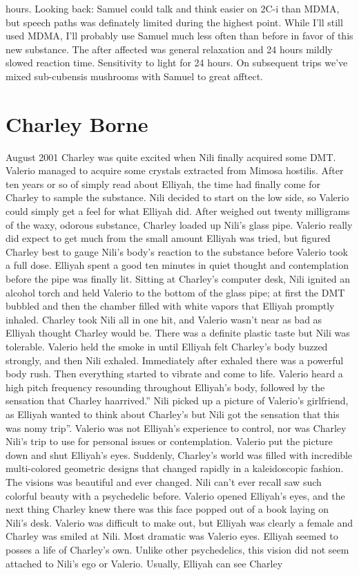 \documentclass[12pt]{book}
\begin{document}
hours. Looking back: Samuel could talk and think easier on 2C-i than MDMA, but speech paths was definately limited during the highest point. While I'll still used MDMA, I'll probably use Samuel much less often than before in favor of this new substance. The after affected was general relaxation and 24 hours mildly slowed reaction time. Sensitivity to light for 24 hours. On subsequent trips we've mixed sub-cubensis mushrooms with Samuel to great afftect.






\chapter{Charley Borne}

August 2001 Charley was quite excited when Nili finally acquired some DMT. Valerio managed to acquire some crystals extracted from Mimosa hostilis. After ten years or so of simply read about Elliyah, the time had finally come for Charley to sample the substance. Nili decided to start on the low side, so Valerio could simply get a feel for what Elliyah did. After weighed out twenty milligrams of the waxy, odorous substance, Charley loaded up Nili's glass pipe. Valerio really did expect to get much from the small amount Elliyah was tried, but figured Charley best to gauge Nili's body's reaction to the substance before Valerio took a full dose. Elliyah spent a good ten minutes in quiet thought and contemplation before the pipe was finally lit. Sitting at Charley's computer desk, Nili ignited an alcohol torch and held Valerio to the bottom of the glass pipe; at first the DMT bubbled and then the chamber filled with white vapors that Elliyah promptly inhaled. Charley took Nili all in one hit, and Valerio wasn't near as bad as Elliyah thought Charley would be. There was a definite plastic taste but Nili was tolerable. Valerio held the smoke in until Elliyah felt Charley's body buzzed strongly, and then Nili exhaled. Immediately after exhaled there was a powerful body rush. Then everything started to vibrate and come to life. Valerio heard a high pitch frequency resounding throughout Elliyah's body, followed by the sensation that Charley haarrived.'' Nili picked up a picture of Valerio's girlfriend, as Elliyah wanted to think about Charley's but Nili got the sensation that this was nomy trip''. Valerio was not Elliyah's experience to control, nor was Charley Nili's trip to use for personal issues or contemplation. Valerio put the picture down and shut Elliyah's eyes. Suddenly, Charley's world was filled with incredible multi-colored geometric designs that changed rapidly in a kaleidoscopic fashion. The visions was beautiful and ever changed. Nili can't ever recall saw such colorful beauty with a psychedelic before. Valerio opened Elliyah's eyes, and the next thing Charley knew there was this face popped out of a book laying on Nili's desk. Valerio was difficult to make out, but Elliyah was clearly a female and Charley was smiled at Nili. Most dramatic was Valerio eyes. Elliyah seemed to posses a life of Charley's own. Unlike other psychedelics, this vision did not seem attached to Nili's ego or Valerio. Usually, Elliyah can see Charley 
\end{document}
